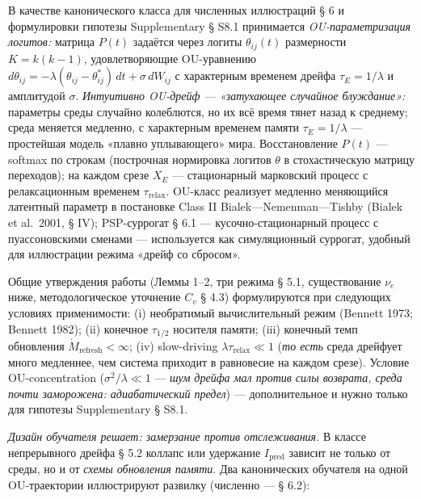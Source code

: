 \documentclass[pdflatex,sn-mathphys-ay]{sn-jnl}
\begin{document}
В качестве канонического класса для численных иллюстраций § 6 и формулировки гипотезы Supplementary § S8.1 принимается \emph{OU-параметризация логитов:} матрица \(P(t)\) задаётся через логиты \(\theta_{ij}(t)\) размерности \(K = k(k-1)\), удовлетворяющие OU-уравнению \(d\theta_{ij} = -\lambda(\theta_{ij} - \theta_{ij}^*)\,dt + \sigma\,dW_{ij}\) с характерным временем дрейфа \(\tau_E = 1/\lambda\) и амплитудой \(\sigma\). \emph{Интуитивно OU-дрейф --- «затухающее случайное блуждание»:} параметры среды случайно колеблются, но их всё время тянет назад к среднему; среда меняется медленно, с характерным временем памяти \(\tau_E = 1/\lambda\) --- простейшая модель «плавно уплывающего» мира. Восстановление \(P(t)\) --- softmax по строкам (построчная нормировка логитов \(\theta\) в стохастическую матрицу переходов); на каждом срезе \(X_E\) --- стационарный марковский процесс с релаксационным временем \(\tau_{\text{relax}}\). OU-класс реализует медленно меняющийся латентный параметр в постановке Class II Bialek---Nemenman---Tishby (Bialek et al.~2001, § IV); PSP-суррогат § 6.1 --- кусочно-стационарный процесс с пуассоновскими сменами --- используется как симуляционный суррогат, удобный для иллюстрации режима «дрейф со сбросом».



Общие утверждения работы (Леммы 1--2, три режима § 5.1, существование \(\nu_c\) ниже, методологическое уточнение \(C_v\) § 4.3) формулируются при следующих условиях применимости: (i) необратимый вычислительный режим (Bennett 1973; Bennett 1982); (ii) конечное \(\tau_{1/2}\) носителя памяти; (iii) конечный темп обновления \(\dot{M}_{\text{refresh}} < \infty\); (iv) slow-driving \(\lambda \tau_{\text{relax}} \ll 1\) (\emph{то есть} среда дрейфует много медленнее, чем система приходит в равновесие на каждом срезе). Условие OU-concentration (\(\sigma^2/\lambda \ll 1\) --- \emph{шум дрейфа мал против силы возврата, среда почти заморожена: адиабатический предел}) --- дополнительное и нужно только для гипотезы Supplementary § S8.1.



\emph{Дизайн обучателя решает: замерзание против отслеживания.} В классе непрерывного дрейфа § 5.2 коллапс или удержание \(I_{\text{pred}}\) зависит не только от среды, но и от \emph{схемы обновления памяти}. Два канонических обучателя на одной OU-траектории иллюстрируют развилку (численно --- § 6.2):
\end{document}

